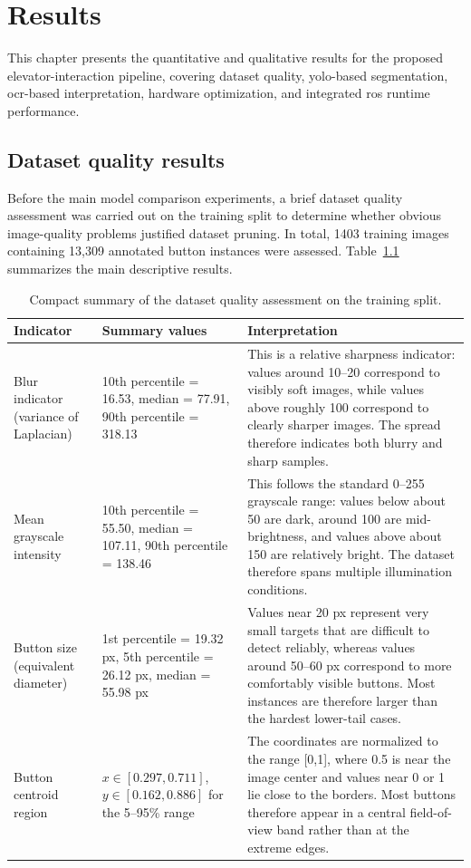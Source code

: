 \chapter{Results}
\label{ch:results}

This chapter presents the quantitative and qualitative results for the
proposed elevator-interaction pipeline, covering dataset quality,
\gls{yolo}-based segmentation, \gls{ocr}-based interpretation, hardware
optimization, and integrated \gls{ros} runtime performance.

\section{Dataset quality results}
\label{sec:dataset_quality_results}

Before the main model comparison experiments, a brief dataset quality assessment
was carried out on the training split to determine whether obvious image-quality
problems justified dataset pruning. In total, 1403 training images containing
13{,}309 annotated button instances were assessed. Table~\ref{tab:dataset_quality_summary}
summarizes the main descriptive results.

\begin{table}[htbp]
    \centering
    \caption{Compact summary of the dataset quality assessment on the training split.}
    \label{tab:dataset_quality_summary}
    \small
    \begin{tabular}{p{4.2cm}p{5.2cm}p{5.1cm}}
        \toprule
        Indicator & Summary values & Interpretation \\
        \midrule
        Blur indicator (variance of Laplacian) & 10th percentile = 16.53, median = 77.91, 90th percentile = 318.13 & This is a relative sharpness indicator: values around 10--20 correspond to visibly soft images, while values above roughly 100 correspond to clearly sharper images. The spread therefore indicates both blurry and sharp samples. \\
        Mean grayscale intensity & 10th percentile = 55.50, median = 107.11, 90th percentile = 138.46 & This follows the standard 0--255 grayscale range: values below about 50 are dark, around 100 are mid-brightness, and values above about 150 are relatively bright. The dataset therefore spans multiple illumination conditions. \\
        Button size (equivalent diameter) & 1st percentile = 19.32 px, 5th percentile = 26.12 px, median = 55.98 px & Values near 20 px represent very small targets that are difficult to detect reliably, whereas values around 50--60 px correspond to more comfortably visible buttons. Most instances are therefore larger than the hardest lower-tail cases. \\
        Button centroid region & $x \in [0.297, 0.711]$, $y \in [0.162, 0.886]$ for the 5--95\% range & The coordinates are normalized to the range [0,1], where 0.5 is near the image center and values near 0 or 1 lie close to the borders. Most buttons therefore appear in a central field-of-view band rather than at the extreme edges. \\
        \bottomrule
    \end{tabular}
\end{table}

